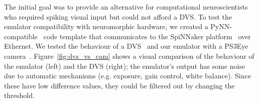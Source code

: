 \documentclass[conference]{IEEEtran}
\begin{document}
The initial goal was to provide an alternative for computational neuroscientists who required spiking visual input but could not afford a DVS. To test the emulator compatibility with neuromorphic hardware, we created a PyNN-compatible~\cite{pynn} code template that communicates to the SpiNNaker platform~\cite{spinnakerOverview} over Ethernet. We tested the behaviour of a DVS~\cite{bernabeDVS} and our emulator with a PS3Eye camera~\cite{wikipedia:ps3eye}. Figure~\ref{fig:dvs_vs_cam} shows a visual comparison of the behaviour of the emulator (left) and the DVS (right); the emulator's output has some noise due to automatic mechanisms (e.g. exposure, gain control, white balance). Since these have low difference values, they could be filtered out by changing the threshold.


\begin{figure}[htb]
  \captionsetup[subfigure]{justification=centering}
  

\end{figure}
\end{document}
